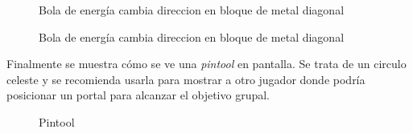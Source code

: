 \documentclass[a4paper]{article}
\begin{document}
\begin{figure}[!h]
	\caption{Bola de energía cambia direccion en bloque de metal diagonal}
	\label{fig:diagrama14}
\end{figure}

\begin{figure}[!h]
	\caption{Bola de energía cambia direccion en bloque de metal diagonal}
	\label{fig:diagrama15}
\end{figure}

\newpage

Finalmente se muestra cómo se ve una \textit{pintool} en pantalla. Se trata de un circulo celeste y se recomienda usarla para mostrar a otro jugador donde podría posicionar un portal para alcanzar el objetivo grupal.

\begin{figure}[!h]
	\caption{Pintool}
	\label{fig:diagrama16}
\end{figure}
\end{document}
